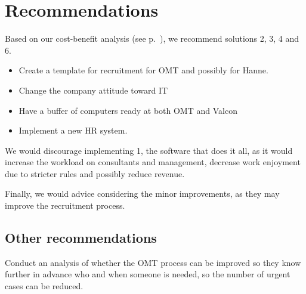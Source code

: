 \section{Recommendations}
Based on our cost-benefit analysis (see p.~\pageref{app:cost_benefit_analysis}), we recommend solutions 2, 3, 4 and 6.
\begin{itemize}

\item{Create a template for recruitment for OMT and possibly for Hanne.}
\item{Change the company attitude toward IT}
\item{Have a buffer of computers ready at both OMT and Valcon}
\item{Implement a new HR system.}
\end{itemize}

We would discourage implementing 1, the software that does it all, as it would increase the workload on consultants and management, decrease work enjoyment due to stricter rules and possibly reduce revenue.

Finally, we would advice considering the minor improvements, as they may improve the recruitment process.

\subsection{Other recommendations}
Conduct an analysis of whether the OMT process can be improved so they know further in advance who and when someone is needed, so the number of urgent cases can be reduced.